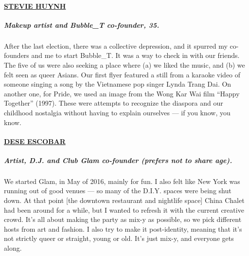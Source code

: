 \hypertarget{stevie-huynh}{%
\paragraph{\texorpdfstring{\href{https://www.instagram.com/steviehuynh/?hl=en}{STEVIE
HUYNH}}{STEVIE HUYNH}}\label{stevie-huynh}}

\hypertarget{makeup-artist-and-bubble_t-co-founder-35}{%
\subparagraph{\texorpdfstring{\textbf{Makeup artist and Bubble\_T
co-founder,
35.}}{Makeup artist and Bubble\_T co-founder, 35.}}\label{makeup-artist-and-bubble_t-co-founder-35}}

After the last election, there was a collective depression, and it
spurred my co-founders and me to start Bubble\_T. It was a way to check
in with our friends. The five of us were also seeking a place where (a)
we liked the music, and (b) we felt seen as queer Asians. Our first
flyer featured a still from a karaoke video of someone singing a song by
the Vietnamese pop singer Lynda Trang Dai. On another one, for Pride, we
used an image from the Wong Kar Wai film ``Happy Together'' (1997).
These were attempts to recognize the diaspora and our childhood
nostalgia without having to explain ourselves --- if you know, you know.

\hypertarget{dese-escobar}{%
\paragraph{\texorpdfstring{\href{https://www.instagram.com/1inamilli0nangel/?hl=en}{DESE
ESCOBAR}}{DESE ESCOBAR}}\label{dese-escobar}}

\hypertarget{artist-dj-and-club-glam-co-founder-prefers-not-to-share-age}{%
\subparagraph{\texorpdfstring{\textbf{Artist, D.J. and Club Glam
co-founder (prefers not to share
age).}}{Artist, D.J. and Club Glam co-founder (prefers not to share age).}}\label{artist-dj-and-club-glam-co-founder-prefers-not-to-share-age}}

We started Glam, in May of 2016, mainly for fun. I also felt like New
York was running out of good venues --- so many of the D.I.Y. spaces
were being shut down. At that point {[}the downtown restaurant and
nightlife space{]} China Chalet had been around for a while, but I
wanted to refresh it with the current creative crowd. It's all about
making the party as mix-y as possible, so we pick different hosts from
art and fashion. I also try to make it post-identity, meaning that it's
not strictly queer or straight, young or old. It's just mix-y, and
everyone gets along.

